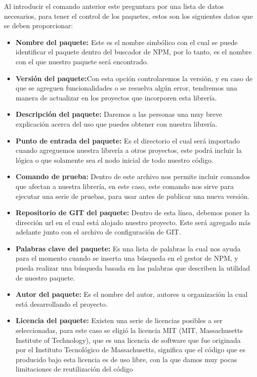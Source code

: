     \newline
    \newline
    Al introducir el comando anterior este preguntara por una lista de datos necesarios, para tener el control de los paquetes, estos son los siguientes datos que se deben proporcionar:
    \begin{itemize}
    \item \textbf{Nombre del paquete:} Este es el nombre simbólico con el cual se puede identificar el paquete dentro del buscador de NPM, por lo tanto, es el nombre con el que nuestro paquete será encontrado.
    \item \textbf{Versión del paquete:}Con esta opción controlaremos la versión, y en caso de que se agreguen funcionalidades o se resuelva algún error, tendremos una manera de actualizar en los proyectos que incorporen esta librería.
    \item \textbf{Descripción del paquete: }Daremos a las personas una muy breve explicación acerca del uso que puedes obtener con nuestra librería.
    \item \textbf{Punto de entrada del paquete:} Es el directorio el cual será importado cuando agreguemos nuestra librería a otros proyectos, este podrá incluir la lógica o que solamente sea el nodo inicial de todo nuestro código.
    \item \textbf{Comando de prueba:} Dentro de este archivo nos permite incluir comandos que afectan a nuestra librería, en este caso, este comando nos sirve para ejecutar una serie de pruebas, para usar antes de publicar una nueva versión.
    \item \textbf{Repositorio de GIT del paquete:} Dentro de esta línea, debemos poner la dirección url en el cual está alojado nuestro proyecto. Este será agregado más adelante junto con el archivo de configuración de GIT.
    \item \textbf{Palabras clave del paquete:} Es una lista de palabras la cual nos ayuda para el momento cuando se inserta una búsqueda en el gestor de NPM, y pueda realizar una búsqueda basada en las palabras que describen la utilidad de nuestro paquete.
    \item \textbf{Autor del paquete:} Es el nombre del autor, autores u organización la cual está desarrollando el proyecto.
    \item \textbf{Licencia del paquete:} Existen una serie de licencias posibles a ser seleccionadas, para este caso se eligió la licencia MIT (MIT, Massachusetts Institute of Technology), que es una licencia de software que fue originada por el Instituto Tecnológico de Massachusetts, significa que el código que es producido bajo esta licencia es de uso libre, con la que damos muy pocas limitaciones de reutilización del código 
    \end{itemize}
